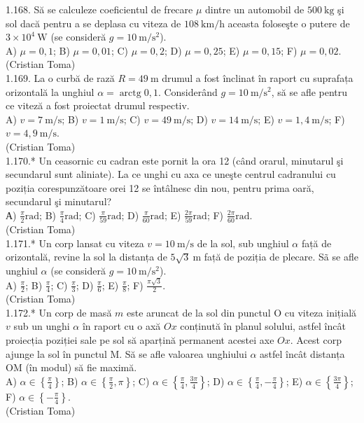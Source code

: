 1.168. Să se calculeze coeficientul de frecare $\mu$ dintre un automobil de $500 \mathrm{~kg}$ şi sol dacă pentru a se deplasa cu viteza de $108 \mathrm{~km} / \mathrm{h}$ aceasta foloseşte o putere de $3 \times 10^{4} \mathrm{~W}$ (se consideră $g=10 \mathrm{~m} / \mathrm{s}^{2}$).\\ A) $\mu=0,1$; B) $\mu=0,01$; C) $\mu=0,2$; D) $\mu=0,25$; E) $\mu=0,15$; F) $\mu=0,02$.\\ (Cristian Toma)\\

1.169. La o curbă de rază $R=49 \mathrm{~m}$ drumul a fost înclinat în raport cu suprafața orizontală la unghiul $\alpha=\operatorname{arctg} 0,1$. Considerând $g=10 \mathrm{~m} / \mathrm{s}^{2}$, să se afle pentru ce viteză a fost proiectat drumul respectiv.\\ A) $v=7 \mathrm{~m} / \mathrm{s}$; B) $v=1 \mathrm{~m} / \mathrm{s}$; C) $v=49 \mathrm{~m} / \mathrm{s}$; D) $v=14 \mathrm{~m} / \mathrm{s}$; E) $v=1,4 \mathrm{~m} / \mathrm{s}$; F) $v=4,9 \mathrm{~m} / \mathrm{s}$.\\ (Cristian Toma)\\

1.170.* Un ceasornic cu cadran este pornit la ora 12 (când orarul, minutarul şi secundarul sunt aliniate). La ce unghi cu axa ce uneşte centrul cadranului cu poziția corespunzătoare orei 12 se întâlnesc din nou, pentru prima oară, secundarul şi minutarul?\\ А) $\frac{\pi}{2} \mathrm{rad}$; B) $\frac{\pi}{4} \mathrm{rad}$; C) $\frac{\pi}{59} \mathrm{rad}$; D) $\frac{\pi}{60} \mathrm{rad}$; E) $\frac{2 \pi}{59} \mathrm{rad}$; F) $\frac{2 \pi}{60} \mathrm{rad}$.\\ (Cristian Toma)\\

1.171.* Un corp lansat cu viteza $v=10 \mathrm{~m} / \mathrm{s}$ de la sol, sub unghiul $\alpha$ față de orizontală, revine la sol la distanța de $5 \sqrt{3} \mathrm{~m}$ față de poziția de plecare. Sã se afle unghiul $\alpha$ (se consideră $g=10 \mathrm{~m} / \mathrm{s}^{2}$).\\ A) $\frac{\pi}{2}$; B) $\frac{\pi}{4}$; C) $\frac{\pi}{3}$; D) $\frac{\pi}{6}$; E) $\frac{\pi}{8}$; F) $\frac{\pi \sqrt{3}}{2}$.\\ (Cristian Toma)\\

1.172.* Un corp de masă $m$ este aruncat de la sol din punctul O cu viteza inițială $v$ sub un unghi $\alpha$ în raport cu o axă $Ox$ conținută în planul solului, astfel încât proiecția poziției sale pe sol să aparțină permanent acestei axe $Ox$. Acest corp ajunge la sol în punctul M. Să se afle valoarea unghiului $\alpha$ astfel încât distanța OM (în modul) să fie maximă.\\ A) $\alpha \in\left\{\frac{\pi}{4}\right\}$; B) $\alpha \in\left\{\frac{\pi}{2}, \pi\right\}$; C) $\alpha \in\left\{\frac{\pi}{4}, \frac{3 \pi}{4}\right\}$; D) $\alpha \in\left\{\frac{\pi}{4},-\frac{\pi}{4}\right\}$; E) $\alpha \in\left\{\frac{3 \pi}{4}\right\}$; F) $\alpha \in\left\{-\frac{\pi}{4}\right\}$.\\ (Cristian Toma)\\

